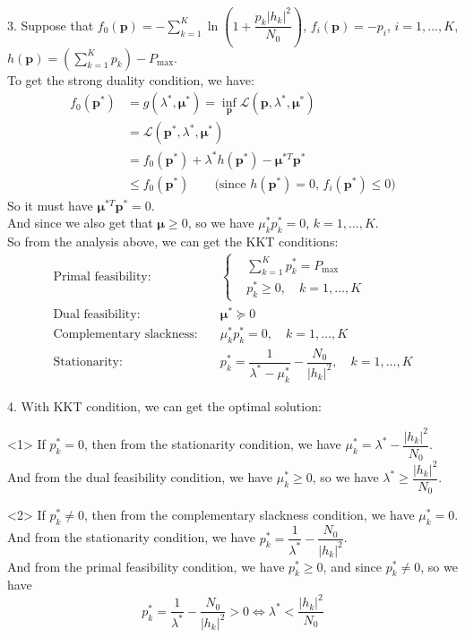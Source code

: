 3. Suppose that $f_0(\pmb p)=-\sum\limits_{k=1}^K \ln \left(1+\dfrac{p_k\left|h_k\right|^2}{N_0}\right)$, $f_i(\pmb p)=-p_i$, $i=1,\ldots,K$, $h(\pmb p)=\left(\sum\limits_{k=1}^K p_k\right)-P_{\max}$. \\
To get the strong duality condition, we have:
\begin{align*}
f_0(\pmb p^*) &= g(\lambda^*,\pmb \mu^*) = \inf_{\pmb p} \mathcal{L}(\pmb p, \lambda^*, \pmb \mu^*) \\
&= \mathcal{L}(\pmb p^*, \lambda^*, \pmb \mu^*) \\
&= f_0(\pmb p^*) + \lambda^* h(\pmb p^*) - \pmb \mu^{*T}\pmb p^* \\
&\leq f_0(\pmb p^*) \qquad \text{(since $h(\pmb p^*)=0$, $f_i(\pmb p^*)\leq 0$)}
\end{align*}
So it must have $\pmb \mu^{*T}\pmb p^* = 0$. \\
And since we also get that $\pmb \mu\geq 0$, so we have $\mu_k^* p_k^* = 0$, $k=1,\ldots,K$. \\
So from the analysis above, we can get the KKT conditions:
\begin{align*}
\text{Primal feasibility:} &\quad
\left\{
\begin{aligned}
&\sum_{k=1}^K p_k^* = P_{\max} \\
&p_k^* \geq 0, \quad k=1,\ldots,K
\end{aligned}
\right. \\
\text{Dual feasibility:} &\quad \pmb \mu^* \succeq 0 \\
\text{Complementary slackness:} &\quad \mu_k^* p_k^* = 0, \quad k=1,\ldots,K \\
\text{Stationarity:} &\quad p_k^* = \dfrac{1}{\lambda^*-\mu_k^*} - \dfrac{N_0}{\left|h_k\right|^2}, \quad k=1,\ldots,K
\end{align*}

4. With KKT condition, we can get the optimal solution:

<1> If $p_k^*=0$, then from the stationarity condition, we have $\mu_k^* = \lambda^* - \dfrac{\left|h_k\right|^2}{N_0}$. \\
And from the dual feasibility condition, we have $\mu_k^*\geq 0$, so we have $\lambda^*\geq \dfrac{\left|h_k\right|^2}{N_0}$.

<2> If $p_k^*\neq 0$, then from the complementary slackness condition, we have $\mu_k^* = 0$. \\
And from the stationarity condition, we have $p_k^* = \dfrac{1}{\lambda^*} - \dfrac{N_0}{\left|h_k\right|^2}$. \\
And from the primal feasibility condition, we have $p_k^* \geq 0$, and since $p_k^*\neq 0$, so we have
$$p_k^* = \dfrac{1}{\lambda^*} - \dfrac{N_0}{\left|h_k\right|^2} > 0 \Leftrightarrow \lambda^* < \dfrac{\left|h_k\right|^2}{N_0}$$

